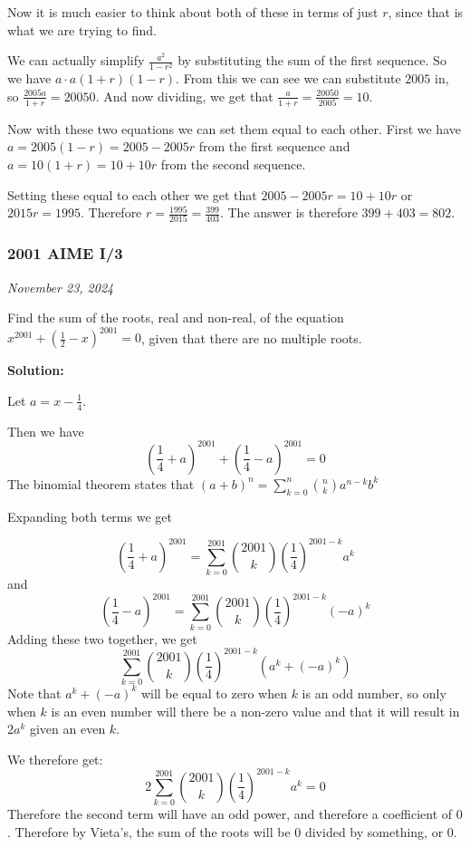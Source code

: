 \documentclass[../mathproblems.tex]{subfiles}
\begin{document}
Now it is much easier to think about both of these in terms of just $r$, since that is what we are trying to find.

We can actually simplify $\frac{a^2}{1-r^2}$ by substituting the sum of the first sequence. So we have ${a\cdot a}{(1+r)(1-r)}$. From this we can see we can substitute $2005$ in, so $\frac{2005a}{1+r} = 20050$. And now dividing, we get that $\frac{a}{1+r} = \frac{20050}{2005} = 10$.

Now with these two equations we can set them equal to each other. First we have $a = 2005(1-r) = 2005-2005r$ from the first sequence and $a = 10(1+r) = 10+10r$ from the second sequence. 

Setting these equal to each other we get that $2005-2005r=10+10r$ or $2015r = 1995$. Therefore $r=\frac{1995}{2015} = \frac{399}{403}$. The answer is therefore $399+403 = \boxed{802}$. 

\noindent\hrulefill



\subsubsection*{2001 AIME I/3} 
\textit{November 23, 2024}

Find the sum of the roots, real and non-real, of the equation $x^{2001}+\left(\frac 12-x\right)^{2001}=0$, given that there are no multiple roots.

\textbf{Solution:}

Let $a=x-\frac{1}{4}$.

Then we have
\[ \left(\frac{1}{4}+a\right)^{2001} + \left(\frac{1}{4}-a\right)^{2001} = 0\]
The binomial theorem states that $(a+b)^n = \sum_{k=0}^n \binom{n}{k} a^{n-k}b^k$

Expanding both terms we get

\[ \left(\frac{1}{4}+a\right)^{2001} = \sum_{k=0}^{2001} \binom{2001}{k}\left(\frac{1}{4}\right)^{2001-k}a^k\]and
\[ \left(\frac{1}{4}-a\right)^{2001} = \sum_{k=0}^{2001} \binom{2001}{k}\left(\frac{1}{4}\right)^{2001-k}(-a)^k\]
Adding these two together, we get
\[ \sum_{k=0}^{2001} \binom{2001}{k}\left(\frac{1}{4}\right)^{2001-k} (a^k+(-a)^k)\]
Note that $a^k+(-a)^k$ will be equal to zero when $k$ is an odd number, so only when $k$ is an even number will there be a non-zero value and that it will result in $2a^k$ given an even $k$.

We therefore get:
\[ 2\sum_{k=0}^{2001} \binom{2001}{k}\left(\frac{1}{4}\right)^{2001-k} a^k = 0\]
Therefore the second term will have an odd power, and therefore a coefficient of $0$. Therefore by Vieta's, the sum of the roots will be $0$ divided by something, or $0$.
\end{document}
